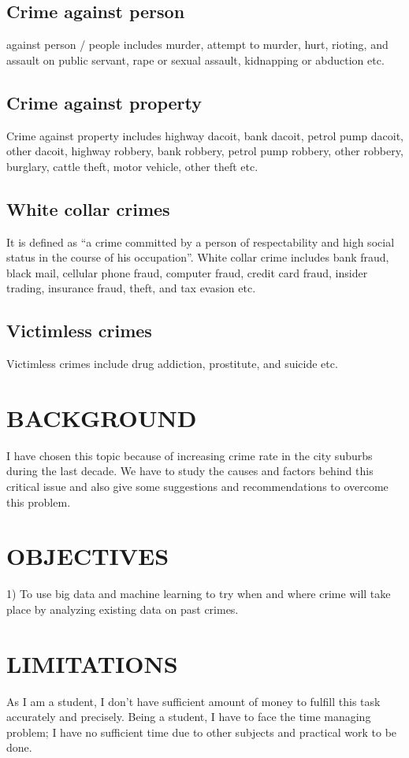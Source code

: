 \documentclass{article}
\begin{document}
\subsection {Crime against person}
against person / people includes murder, attempt to murder, hurt, rioting, and assault on public servant, rape or sexual assault, kidnapping or abduction etc. 
 
\subsection {Crime against property}
Crime against property includes highway dacoit, bank dacoit, petrol pump dacoit, other dacoit, highway robbery, bank robbery, petrol pump robbery, other robbery, burglary, cattle theft, motor vehicle, other theft etc. 
 
\subsection {White collar crimes} 
It is defined as “a crime committed by a person of respectability and high social status in the course 
of his occupation”. 
  White collar crime includes bank fraud, black mail, cellular phone fraud, computer fraud, credit card fraud, insider trading, insurance fraud, theft, and tax evasion etc. 

\subsection {Victimless crimes}
Victimless crimes include drug addiction, prostitute, and suicide etc. 


\section{BACKGROUND} 
I have chosen this topic because of increasing crime rate in the city suburbs during the last decade. We have to study the causes and factors behind this critical issue and also give some suggestions and recommendations to overcome this problem.

\section{OBJECTIVES}
1)	To use big data and machine learning to try when and where crime will take place by analyzing existing data on past crimes.


\section{LIMITATIONS}
As I am a student, I don’t have sufficient amount of money to fulfill this task accurately and precisely. Being a student, I have to face the time managing problem; I have no sufficient time due to other subjects and practical work to be done.
\end{document}
